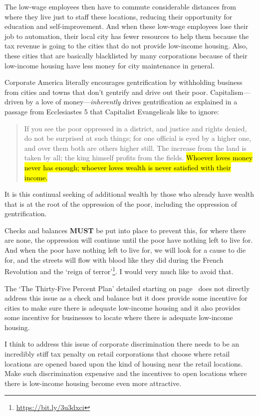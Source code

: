 The low-wage employees then have to commute considerable distances from where they live just to staff these locations, reducing their opportunity for education and self-improvement. And when these low-wage employees lose their job to automation, their local city has fewer resources to help them because the tax revenue is going to the cities that do not provide low-income housing. Also, these cities that are basically blacklisted by many corporations because of their low-income housing have less money for city maintenance in general.

Corporate America literally encourages gentrification by withholding business from cities and towns that don't gentrify and drive out their poor. Capitalism---driven by a love of money---\emph{inherently} drives gentrification as explained in a passage from Ecclesiastes 5 that Capitalist Evangelicals like to ignore:

\begin{quote}
If you see the poor oppressed in a district, and justice and rights denied, do not be surprised at such things; for one official is eyed by a higher one, and over them both are others higher still. The increase from the land is taken by all; the king himself profits from the fields. \hl{Whoever loves money never has enough; whoever loves wealth is never satisfied with their income.}
\end{quote}

It is this continual seeking of additional wealth by those who already have wealth that is at the root of the oppression of the poor, including the oppression of gentrification.

Checks and balances \textbf{MUST} be put into place to prevent this, for where there are none, the oppression will continue until the poor have nothing left to live for. And when the poor have nothing left to live for, we will look for a cause to die for, and the streets will flow with blood like they did during the French Revolution and the `reign of terror'\footnote{\url{https://bit.ly/3u3dxci}}. I would very much like to avoid that.

The `The Thirty-Five Percent Plan' detailed starting on page~\pageref{thirtyfive} does not directly address this issue as a check and balance but it does provide some incentive for cities to make sure there is adequate low-income housing and it also provides some incentive for businesses to locate where there is adequate low-income housing.

I think to address this issue of corporate discrimination there needs to be an incredibly stiff tax penalty on retail corporations that choose where retail locations are opened based upon the kind of housing near the retail locations. Make such discrimination expensive and the incentives to open locations where there is low-income housing become even more attractive.

